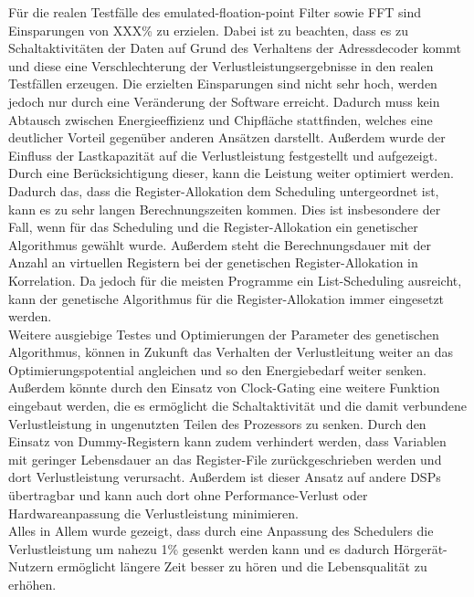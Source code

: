 Für die realen Testfälle des emulated-floation-point Filter sowie FFT sind Einsparungen von XXX\% zu erzielen. Dabei ist zu beachten, dass es zu Schaltaktivitäten der Daten auf Grund des Verhaltens der Adressdecoder kommt und diese eine Verschlechterung der Verlustleistungsergebnisse in den realen Testfällen erzeugen.
Die erzielten Einsparungen sind nicht sehr hoch, werden jedoch nur durch eine Veränderung der Software erreicht. Dadurch muss kein Abtausch zwischen Energieeffizienz und Chipfläche stattfinden, welches eine deutlicher Vorteil gegenüber anderen Ansätzen darstellt.
Außerdem wurde der Einfluss der Lastkapazität auf die Verlustleistung festgestellt und aufgezeigt. Durch eine Berücksichtigung dieser, kann die Leistung weiter optimiert werden.
Dadurch das, dass die Register-Allokation dem Scheduling untergeordnet ist, kann es zu sehr langen Berechnungszeiten kommen. Dies ist insbesondere der Fall, wenn für das Scheduling und die Register-Allokation ein genetischer Algorithmus gewählt wurde. Außerdem steht die Berechnungsdauer mit der Anzahl an virtuellen Registern bei der genetischen Register-Allokation in Korrelation. Da jedoch für die meisten Programme ein List-Scheduling ausreicht, kann der genetische Algorithmus für die Register-Allokation immer eingesetzt werden.\\
Weitere ausgiebige Testes und Optimierungen der Parameter des genetischen Algorithmus, können in Zukunft das Verhalten der Verlustleitung weiter an das Optimierungspotential angleichen und so den Energiebedarf weiter senken. Außerdem könnte durch den Einsatz von Clock-Gating eine weitere Funktion eingebaut werden, die es ermöglicht die Schaltaktivität und die damit verbundene Verlustleistung in ungenutzten Teilen des Prozessors zu senken. Durch den Einsatz von Dummy-Registern kann zudem verhindert werden, dass Variablen mit geringer Lebensdauer an das Register-File zurückgeschrieben werden und dort Verlustleistung verursacht. Außerdem ist dieser Ansatz auf andere DSPs übertragbar und kann auch dort ohne Performance-Verlust oder Hardwareanpassung die Verlustleistung minimieren.\\
Alles in Allem wurde gezeigt, dass durch eine Anpassung des Schedulers die Verlustleistung um nahezu 1\% gesenkt werden kann und es dadurch Hörgerät-Nutzern ermöglicht längere Zeit besser zu hören und die Lebensqualität zu erhöhen.\\
%


